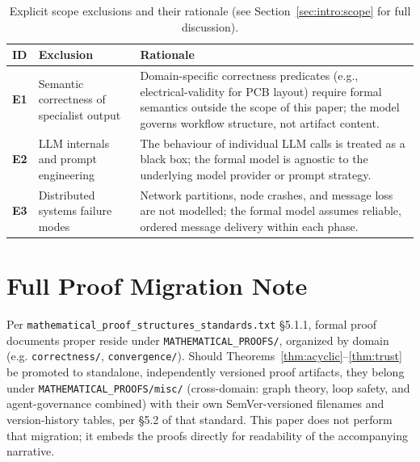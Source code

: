 \documentclass[12pt]{article}
\theoremstyle{definition}
\newcommand{\code}[1]{\texttt{#1}}
\newcommand{\ProofStd}{\code{mathematical\_proof\_\allowbreak structures\_standards.txt}}
\begin{document}
\begin{table}[H]
\centering
\caption{Explicit scope exclusions and their rationale
         (see Section~\ref{sec:intro:scope} for full discussion).}
\label{tab:exclusions}
\begin{tabularx}{\linewidth}{@{}>{\bfseries}p{1.0cm} >{\RaggedRight}p{3.2cm} X@{}}
\toprule
ID & Exclusion & Rationale \\
\midrule
E1 & Semantic correctness of specialist output &
  Domain-specific correctness predicates (e.g., electrical-validity
  for PCB layout) require formal semantics outside the scope of this
  paper; the model governs workflow structure, not artifact content. \\[4pt]
E2 & LLM internals and prompt engineering &
  The behaviour of individual LLM calls is treated as a black box;
  the formal model is agnostic to the underlying model provider or
  prompt strategy. \\[4pt]
E3 & Distributed systems failure modes &
  Network partitions, node crashes, and message loss are not modelled;
  the formal model assumes reliable, ordered message delivery within
  each phase. \\
\bottomrule
\end{tabularx}
\end{table}

\section{Full Proof Migration Note}
\label{app:migration}

\begin{sloppypar}
Per \ProofStd{} \S5.1.1, formal
proof documents proper reside under \code{MATHEMATICAL\_\allowbreak PROOFS/}, organized
by domain (e.g. \code{correctness/}, \code{convergence/}). Should
Theorems~\ref{thm:acyclic}--\ref{thm:trust} be promoted to standalone,
independently versioned proof artifacts, they belong under
\code{MATHEMATICAL\_\allowbreak PROOFS/misc/} (cross-domain: graph theory, loop safety,
and agent-governance combined) with their own SemVer-versioned filenames
and version-history tables, per \S5.2 of that standard. This paper does not
perform that migration; it embeds the proofs directly for readability of
the accompanying narrative.
\end{sloppypar}

\newpage
\end{document}
